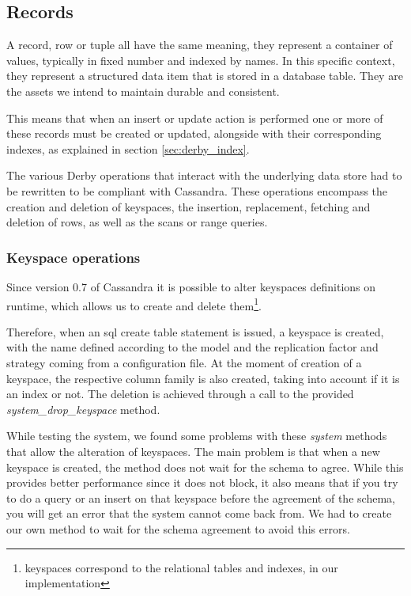 \subsection{Records}
\label{sec:records}
A record, row or tuple all have the same meaning, they represent a container of values, typically in fixed number and indexed by names. In this specific context, they represent a structured data item that is stored in a database table. They are the assets we intend to maintain durable and consistent.

This means that when an insert or update action is performed one or more of these records must be created or updated, alongside with their corresponding indexes, as explained in section \ref{sec:derby_index}.

The various Derby operations that interact with the underlying data store had to be rewritten to be compliant with Cassandra. These operations encompass the creation and deletion of keyspaces, the insertion, replacement, fetching and deletion of rows, as well as the scans or range queries.

\subsubsection{Keyspace operations}
Since version 0.7 of Cassandra it is possible to alter keyspaces definitions on runtime, which allows us to create and delete them\footnote{keyspaces correspond to the relational tables and indexes, in our implementation}.

Therefore, when an \ac{sql} create table statement is issued, a keyspace is created, with the name defined according to the model and the replication factor and strategy coming from a configuration file. At the moment of creation of a keyspace, the respective column family is also created, taking into account if it is an index or not. The deletion is achieved through a call to the provided \emph{system\_drop\_keyspace} method.

While testing the system, we found some problems with these \emph{system} methods that allow the alteration of keyspaces. The main problem is that when a new keyspace is created, the method does not wait for the schema to agree. While this provides better performance since it does not block, it also means that if you try to do a query or an insert on that keyspace before the agreement of the schema, you will get an error that the system cannot come back from. We had to create our own method to wait for the schema agreement to avoid this errors.      


